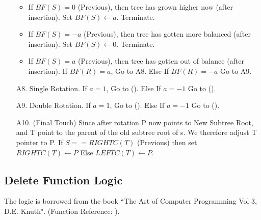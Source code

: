\documentclass{article}
\begin{document}
\begin{itemize}
	    \begin{itemize}
             \item If $BF(S) = 0$ (Previous), then tree has grown higher now (after insertion). Set $BF(S) \leftarrow a$. Terminate.
             \item If $BF(S) = -a$ (Previous), then tree has gotten more balanced (after insertion). Set $BF(S) \leftarrow 0$. Terminate.
             \item If $BF(S) = a$ (Previous), then tree has gotten out of balance (after insertion).
             \newline
             If $BF(R) = a$, Go to A8. Else If $BF(R) = -a$ Go to A9.
       \end{itemize}
     \item[A8.] Single Rotation.  If $a = 1$, Go to (). Else If $a = -1$ Go to ().
     \item[A9.] Double Rotation.  If $a = 1$, Go to (). Else If $a = -1$ Go to ().
     \item[A10.] (Final Touch) Since after rotation P now points to New Subtree Root, and T point to the parent of the old subtree root of s.
    We therefore adjust T pointer to P.
     If $S == RIGHTC(T)$ (Previous) then set $RIGHTC(T) \leftarrow P$ Else $LEFTC(T) \leftarrow P$.
\end{itemize}

\subsection{Delete Function Logic}
The logic is borrowed from the book ``The Art of Computer Programming Vol 3, D.E. Knuth". (Function Reference: ).
\end{document}

